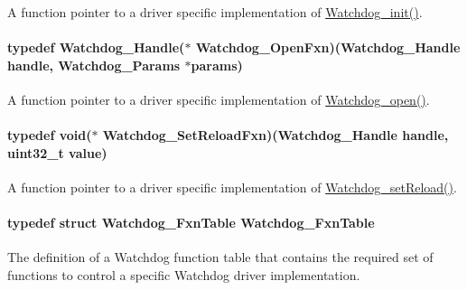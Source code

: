 A function pointer to a driver specific implementation of \hyperlink{_watchdog_8h_afaadfb59be17661ae95562f2081355e7}{Watchdog\-\_\-init()}. 

\paragraph[{Watchdog\-\_\-\-Open\-Fxn}]{\setlength{\rightskip}{0pt plus 5cm}typedef {\bf Watchdog\-\_\-\-Handle}($\ast$ Watchdog\-\_\-\-Open\-Fxn)({\bf Watchdog\-\_\-\-Handle} handle, {\bf Watchdog\-\_\-\-Params} $\ast$params)}\label{_watchdog_8h_a4b02084ebc2b2eccc46861ace7881448}


A function pointer to a driver specific implementation of \hyperlink{_watchdog_8h_aa5ce656aa6d5199e1efdb4ca2cd9fb7c}{Watchdog\-\_\-open()}. 

\paragraph[{Watchdog\-\_\-\-Set\-Reload\-Fxn}]{\setlength{\rightskip}{0pt plus 5cm}typedef void($\ast$ Watchdog\-\_\-\-Set\-Reload\-Fxn)({\bf Watchdog\-\_\-\-Handle} handle, uint32\-\_\-t value)}\label{_watchdog_8h_a420d19a34109e5dbb1b5f2953f9a8328}


A function pointer to a driver specific implementation of \hyperlink{_watchdog_8h_a77ec81e1304fe05b77a9976e10e2d9a3}{Watchdog\-\_\-set\-Reload()}. 

\paragraph[{Watchdog\-\_\-\-Fxn\-Table}]{\setlength{\rightskip}{0pt plus 5cm}typedef struct {\bf Watchdog\-\_\-\-Fxn\-Table}  {\bf Watchdog\-\_\-\-Fxn\-Table}}\label{_watchdog_8h_ad3e804ec79af5e10e8ef3af301860ef5}


The definition of a Watchdog function table that contains the required set of functions to control a specific Watchdog driver implementation. 

